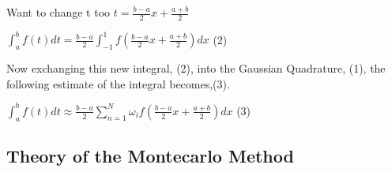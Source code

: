 \documentclass{article}
\begin{document}
Want to change t too $t = \frac{b-a}{2}x + \frac{a+b}{2}$
\newline
\newline

$\int_{a}^{b} f(t) dt = \frac{b-a}{2}\int_{-1}^{1} f(\frac{b-a}{2}x + \frac{a+b}{2}) dx$ (2)
\newline
\newline

Now exchanging this new integral, (2), into the Gaussian Quadrature, (1), the following estimate of the integral becomes,(3). 
\newline
\newline

$\int_{a}^{b} f(t) dt \approx \frac{b-a}{2} \sum_{n=1}^{N} \omega_i f(\frac{b-a}{2}x + \frac{a+b}{2}) dx$ (3)


\subsection{Theory of the Montecarlo Method}
\end{document}
